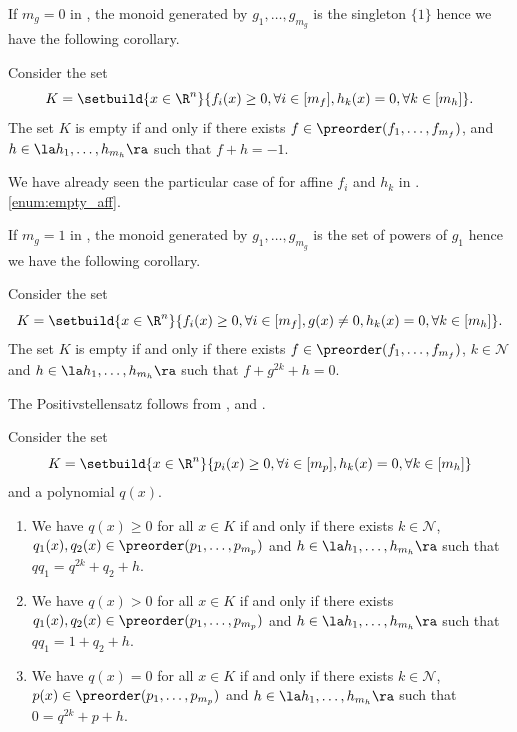 \documentclass[11pt,twoside,a4paper,openright]{uclouvain-thesis}
\begin{document}
If $m_g = 0$ in , the monoid generated by $g_1, \ldots, g_{m_g}$ is the singleton $\{1\}$ hence we have the following corollary.

\begin{mycoro}
  \label{coro:positiv0}
  Consider the set
  \[ K = \setbuild{x \in \R^n}{f_i(x) \ge 0, \forall i \in [m_f], h_k(x) = 0, \forall k \in [m_h]}. \]
  The set $K$ is empty if and only if there exists $f \in \preorder(f_1, \ldots, f_{m_f})$,
  and
  $h \in \la h_1, \ldots, h_{m_h} \ra$ such that $f + h = -1$.
\end{mycoro}

We have already seen the particular case of  for affine $f_i$ and $h_k$ in .\ref{enum:empty_aff}.

If $m_g = 1$ in , the monoid generated by $g_1, \ldots, g_{m_g}$ is the set of powers of $g_1$ hence we have the following corollary.

\begin{mycoro}
  \label{coro:positiv1}
  Consider the set
  \[ K = \setbuild{x \in \R^n}{f_i(x) \ge 0, \forall i \in [m_f], g(x) \neq 0, h_k(x) = 0, \forall k \in [m_h]}. \]
  The set $K$ is empty if and only if there exists $f \in \preorder(f_1, \ldots, f_{m_f})$, $k \in \mathcal{N}$
  and
  $h \in \la h_1, \ldots, h_{m_h} \ra$ such that $f + g^{2k} + h = 0$.
\end{mycoro}

The Positivstellensatz follows from ,  and .

\begin{mycoro}
  \label{coro:positiv}
  Consider the set
  \[ K = \setbuild{x \in \R^n}{p_i(x) \ge 0, \forall i \in [m_p], h_k(x) = 0, \forall k \in [m_h]} \]
  and a polynomial $q(x)$.
  \begin{enumerate}
    \item We have $q(x) \ge 0$ for all $x \in K$ if and only if there exists
      $k \in \mathcal{N}$, $q_1(x), q_2(x) \in \preorder(p_1, \ldots, p_{m_p})$ and $h \in \la h_1, \ldots, h_{m_h} \ra$ such that
      $qq_1 = q^{2k} + q_2 + h$.
    \item We have $q(x) > 0$ for all $x \in K$ if and only if there exists
      $q_1(x), q_2(x) \in \preorder(p_1, \ldots, p_{m_p})$ and $h \in \la h_1, \ldots, h_{m_h} \ra$ such that
      $qq_1 = 1 + q_2 + h$.
    \item We have $q(x) = 0$ for all $x \in K$ if and only if there exists
      $k \in \mathcal{N}$, $p(x) \in \preorder(p_1, \ldots, p_{m_p})$ and $h \in \la h_1, \ldots, h_{m_h} \ra$ such that
      $0 = q^{2k} + p + h$.
  \end{enumerate}
\end{mycoro}
\end{document}
